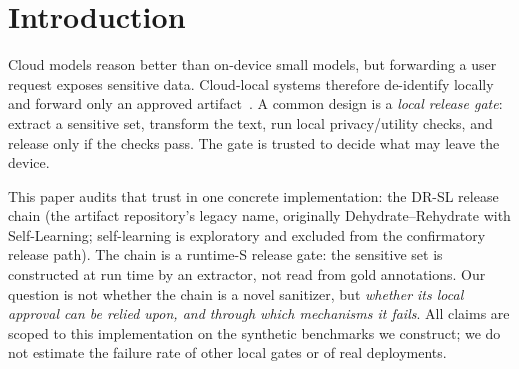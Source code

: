 \documentclass[11pt,a4paper]{article}
\begin{document}
\section{Introduction}

Cloud models reason better than on-device small models, but forwarding a user request exposes sensitive data. Cloud-local systems therefore de-identify locally and forward only an approved artifact~\cite{hao2024hybrid,jin2025cecollm,li2025collab,siyan2025papillon,das2025security,lukas2023pii}. A common design is a \emph{local release gate}: extract a sensitive set, transform the text, run local privacy/utility checks, and release only if the checks pass. The gate is trusted to decide what may leave the device.

This paper audits that trust in one concrete implementation: the DR-SL release chain (the artifact repository's legacy name, originally Dehydrate--Rehydrate with Self-Learning; self-learning is exploratory and excluded from the confirmatory release path). The chain is a runtime-S release gate: the sensitive set is constructed at run time by an extractor, not read from gold annotations. Our question is not whether the chain is a novel sanitizer, but \emph{whether its local approval can be relied upon, and through which mechanisms it fails}. All claims are scoped to this implementation on the synthetic benchmarks we construct; we do not estimate the failure rate of other local gates or of real deployments.
\end{document}

